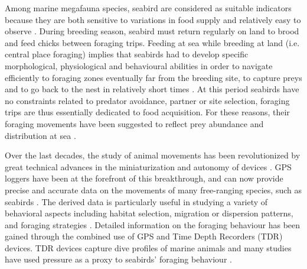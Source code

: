 \documentclass{article}
\begin{document}
Among marine megafauna species, seabird are considered as suitable indicators because they are both sensitive to variations in food supply and relatively easy to observe \cite{furness_seabirds_1997, wakefield_quantifying_2009}.
During breeding season, seabird must return regularly on land to brood and feed chicks between foraging trips.
Feeding at sea while breeding at land (i.e. central place foraging) implies  that seabirds had to develop specific morphological, physiological and behavioural abilities in order to navigate efficiently to foraging zones eventually far from the breeding site, to capture preys and to go back to the nest in relatively short times \cite{schreiber_biology_2001}.
At this period seabirds have no constraints related to predator avoidance, partner or site selection, foraging trips are thus essentially dedicated to food acquisition. For these reasons, their foraging movements have been suggested to reflect prey abundance and distribution at sea \cite{weimerskirch_are_2007}.

Over the last decades, the study of animal movements has been revolutionized by great technical advances in the miniaturization and autonomy of devices \cite{ropert-coudert_diving_2009,monaco_bio-logging_2016}.
GPS loggers have been at the forefront of this breakthrough, and can now provide precise and accurate data on the movements of many free-ranging species, such as seabirds \cite{wakefield_quantifying_2009,yoda_advances_2019}.
The derived data is particularly useful in studying a variety of behavioral aspects including habitat selection, migration or dispersion patterns, and foraging
strategies \cite{nathan_movement_2008}.
Detailed information on the foraging behaviour has been gained through the combined use of GPS and Time Depth Recorders (TDR) devices.
TDR devices capture dive profiles of marine animals and many studies have used pressure as a proxy to seabirds' foraging behaviour \cite{cox_seabird_2016,lewis_flexible_2004,shoji_foraging_2015}.
\end{document}
